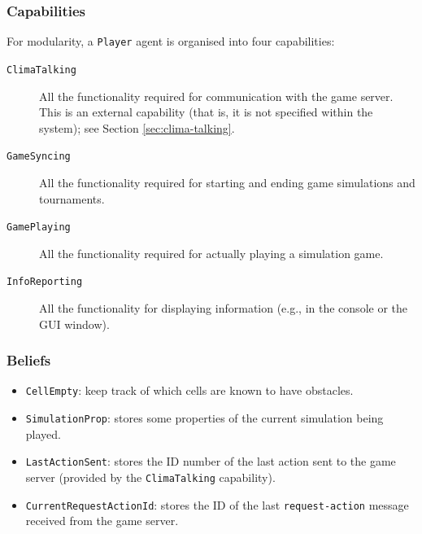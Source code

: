 \documentclass[10pt]{article}
\begin{document}
\subsubsection*{Capabilities}

For modularity, a \texttt{Player} agent is organised into four capabilities:
\begin{description}
 \item[\rm \texttt{ClimaTalking}] All the functionality required for
communication with the game server. This is an external capability (that is,
it is not specified within the system); see Section \ref{sec:clima-talking}.

 \item[\rm \texttt{GameSyncing}] All the functionality required for starting
and ending game simulations and tournaments.

 \item[\rm \texttt{GamePlaying}] All the functionality required for
actually playing a simulation game.

 \item[\rm \texttt{InfoReporting}] All the functionality for displaying
information (e.g., in the console or the GUI window).

\end{description}



%
\subsubsection*{Beliefs}
\begin{itemize}
\item \texttt{CellEmpty}: keep track of which cells are known to have obstacles.

\item \texttt{SimulationProp}: stores some properties of the current simulation
being played.

\item \texttt{LastActionSent}: stores the ID number of the last action sent to
the game server (provided by the \texttt{ClimaTalking} capability).

\item \texttt{CurrentRequestActionId}: stores the ID of the last
\texttt{request-action} message received from the game server.
\end{itemize}


\end{document}
